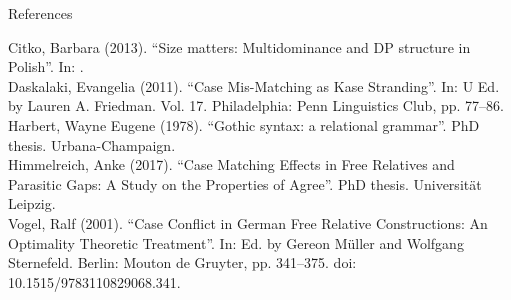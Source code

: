 \documentclass[xcolor=dvipsnames,10pt]{beamer}
\begin{document}
\begin{frame}{References}

Citko, Barbara (2013). “Size matters: Multidominance and DP structure in Polish”. In: .\\
Daskalaki, Evangelia (2011). “Case Mis-Matching as Kase Stranding”. In: U Ed. by Lauren A. Friedman. Vol. 17. Philadelphia: Penn Linguistics Club, pp. 77–86.\\
Harbert, Wayne Eugene (1978). “Gothic syntax: a relational grammar”. PhD thesis. Urbana-Champaign.\\
Himmelreich, Anke (2017). “Case Matching Effects in Free Relatives and Parasitic Gaps: A Study on the Properties of Agree”. PhD thesis. Universität Leipzig.\\
Vogel, Ralf (2001). “Case Conflict in German Free Relative Constructions: An Optimality Theoretic Treatment”. In:  Ed. by Gereon Müller and Wolfgang Sternefeld. Berlin: Mouton de Gruyter, pp. 341–375. doi: 10.1515/9783110829068.341.

\end{frame}
\end{document}
